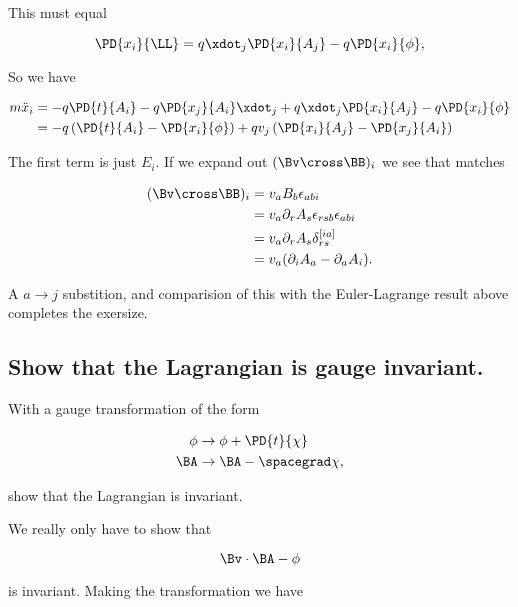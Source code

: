 This must equal

\begin{equation}\label{eqn:classicalMechanicsPs1:100}
\PD{x_i}{\LL} = q \xdot_j \PD{x_i}{A_j} - q \PD{x_i}{\phi},
\end{equation}

So we have

\begin{align*}
m \ddot{x}_i 
&= 
-q \PD{t}{A_i}
- q \PD{x_j}{A_i} \xdot_j
+q \xdot_j \PD{x_i}{A_j} - q \PD{x_i}{\phi} \\
&=
-q \left( \PD{t}{A_i} - \PD{x_i}{\phi} \right)
+q v_j \left( \PD{x_i}{A_j} - \PD{x_j}{A_i} \right)
\end{align*}

The first term is just $E_i$.  If we expand out $(\Bv \cross \BB)_i$ we see that matches

\begin{align*}
(\Bv \cross \BB)_i
&=
v_a B_b \epsilon_{abi} \\
&=
v_a \partial_r A_s \epsilon_{rsb} \epsilon_{abi} \\
&=
v_a \partial_r A_s \delta_{rs}^{[ia]} \\
&=
v_a (\partial_i A_a - \partial_a A_i).
\end{align*}

A $a \rightarrow j$ substition, and comparision of this with the Euler-Lagrange result above completes the exersize.

\subsection{Show that the Lagrangian is gauge invariant.}

With a gauge transformation of the form

\begin{align}\label{eqn:classicalMechanicsPs1:120}
\phi &\rightarrow \phi + \PD{t}{\chi} \\
\BA &\rightarrow \BA - \spacegrad \chi,
\end{align}

show that the Lagrangian is invariant.

We really only have to show that 

\begin{equation}\label{eqn:classicalMechanicsPs1:140}
\Bv \cdot \BA - \phi
\end{equation}

is invariant.  Making the transformation we have

